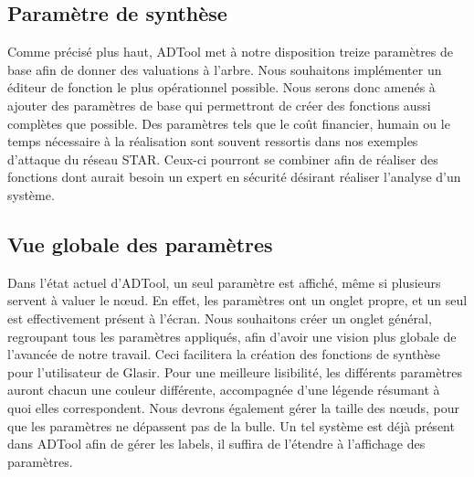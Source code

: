 	\subsection{Paramètre de synthèse}
	Comme précisé plus haut, ADTool met à notre disposition treize paramètres de base afin de donner des valuations à l'arbre. Nous souhaitons implémenter un éditeur de fonction le plus opérationnel possible. Nous serons donc amenés à ajouter des paramètres de base qui permettront de créer des fonctions aussi complètes que possible. Des paramètres tels que le coût financier, humain ou le temps nécessaire à la réalisation sont souvent ressortis dans nos exemples d'attaque du réseau STAR. Ceux-ci pourront se combiner afin de réaliser des fonctions dont aurait besoin un expert en sécurité désirant réaliser l'analyse d'un système.
		
	\subsection{Vue globale des paramètres}
	Dans l'état actuel d'ADTool, un seul paramètre est affiché, même si plusieurs servent à valuer le nœud. En effet, les paramètres ont un onglet propre, et un seul est effectivement présent à l'écran. Nous souhaitons créer un onglet général, regroupant tous les paramètres appliqués, afin d'avoir une vision plus globale de l'avancée de notre travail. Ceci facilitera la création des fonctions de synthèse pour l'utilisateur de Glasir.
	Pour une meilleure lisibilité, les différents paramètres auront chacun une couleur différente, accompagnée d'une légende résumant à quoi elles correspondent.
	Nous devrons également gérer la taille des nœuds, pour que les paramètres ne dépassent pas de la bulle. Un tel système est déjà présent dans ADTool afin de gérer les labels, il suffira de l'étendre à l'affichage des paramètres.
